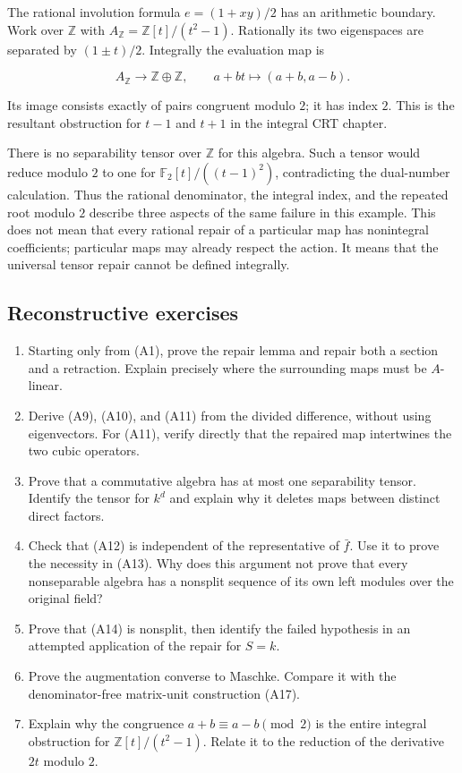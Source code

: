 \documentclass[
  11pt,
]{article}
\providecommand{\tightlist}{%
  \setlength{\itemsep}{0pt}\setlength{\parskip}{0pt}}
\begin{document}
The rational involution formula \(e=(1+xy)/2\) has an arithmetic
boundary. Work over \(\mathbb Z\) with
\(A_{\mathbb Z}=\mathbb Z[t]/(t^2-1)\). Rationally its two eigenspaces
are separated by \((1\pm t)/2\). Integrally the evaluation map is

\[
A_{\mathbb Z}\longrightarrow\mathbb Z\oplus\mathbb Z,
\qquad a+bt\longmapsto(a+b,a-b).
\]

Its image consists exactly of pairs congruent modulo \(2\); it has index
\(2\). This is the resultant obstruction for \(t-1\) and \(t+1\) in the
integral CRT chapter.

There is no separability tensor over \(\mathbb Z\) for this algebra.
Such a tensor would reduce modulo \(2\) to one for
\(\mathbb F_2[t]/((t-1)^2)\), contradicting the dual-number calculation.
Thus the rational denominator, the integral index, and the repeated root
modulo \(2\) describe three aspects of the same failure in this example.
This does not mean that every rational repair of a particular map has
nonintegral coefficients; particular maps may already respect the
action. It means that the universal tensor repair cannot be defined
integrally.

\subsection{Reconstructive exercises}\label{reconstructive-exercises}

\begin{enumerate}
\def\labelenumi{\arabic{enumi}.}
\tightlist
\item
  Starting only from (A1), prove the repair lemma and repair both a
  section and a retraction. Explain precisely where the surrounding maps
  must be \(A\)-linear.
\item
  Derive (A9), (A10), and (A11) from the divided difference, without
  using eigenvectors. For (A11), verify directly that the repaired map
  intertwines the two cubic operators.
\item
  Prove that a commutative algebra has at most one separability tensor.
  Identify the tensor for \(k^d\) and explain why it deletes maps
  between distinct direct factors.
\item
  Check that (A12) is independent of the representative of \(\bar f\).
  Use it to prove the necessity in (A13). Why does this argument not
  prove that every nonseparable algebra has a nonsplit sequence of its
  own left modules over the original field?
\item
  Prove that (A14) is nonsplit, then identify the failed hypothesis in
  an attempted application of the repair for \(S=k\).
\item
  Prove the augmentation converse to Maschke. Compare it with the
  denominator-free matrix-unit construction (A17).
\item
  Explain why the congruence \(a+b\equiv a-b\pmod2\) is the entire
  integral obstruction for \(\mathbb Z[t]/(t^2-1)\). Relate it to the
  reduction of the derivative \(2t\) modulo \(2\).
\end{enumerate}
\end{document}
